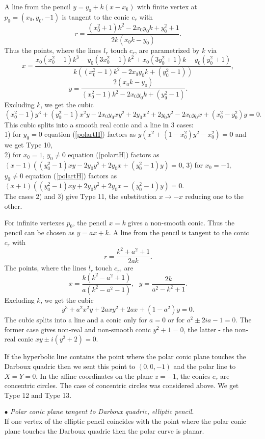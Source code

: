 \documentclass[11pt,a4paper]{article}
\begin{document}
A line from the pencil  $y=y_0+k(x - x_0)$ with  finite vertex at $p_0=(x_0,y_0,-1)$ is tangent to the conic $c_r$ with
$$
r=\frac{(x_0^2 + 1)k^2 - 2x_0y_0k + y_0^2 + 1}{2k(x_0k - y_0)}. 
$$ Thus the points, where the lines $l_r$ touch $c_r$, are parametrized by $k$ via 
$$
x=\frac{x_0(x_0^2 - 1)k^3 - y_0(3x_0^2 - 1)k^2 + x_0(3y_0^2 + 1)k - y_0(y_0^2 + 1)}{k((x_0^2 - 1)k^2 - 2x_0y_0k + (y_0^2 - 1))},
$$
$$
y=\frac{2(x_0k - y_0)}{(x_0^2 - 1)k^2 - 2x_0y_0k + (y_0^2 - 1)}. 
$$ 
Excluding $k$, we get the cubic
\begin{equation}\label{polartH}
(x_0^2 - 1)y^3 +(y_0^2 - 1)x^2y  - 2x_0y_0xy^2+ 2y_0x^2+ 2y_0y^2- 2x_0y_0x +(x_0^2 - y_0^2)y=0.
\end{equation}
This cubic splits into a smooth real conic and a line in 3 cases:\\ 
1) for $y_0=0$ equation (\ref{polartH}) factors as $y(x^2 +(1-x_0^2)y^2 - x_0^2)=0$ and we get Type 10,\\
 2)  for $x_0= 1$, $y_0\ne 0$ equation (\ref{polartH}) factors as $(x - 1)((y_0^2-1)xy - 2y_0y^2 +2y_0x+ (y_0^2-1)y)=0$,
3)  for $x_0= -1$, $y_0\ne 0$ equation (\ref{polartH}) factors as $(x + 1)((y_0^2-1)xy + 2y_0y^2 +2y_0x- (y_0^2-1)y)=0$.\\
The cases 2) and 3) give Type 11, the substitution $x\to -x$ reducing one to the other.   

For infinite vertexes $p_0$, the pencil $x=k$ gives a non-smooth conic. Thus the pencil can be chosen as $y=ax+k$. A line from the pencil is tangent to the conic $c_r$ with
$$
r=\frac{k^2+a^2+1}{2ak}. 
$$ The points, where the lines $l_r$ touch $c_r$, are  
$$
x=\frac{k(k^2 -a^2+1)}{a(k^2-a^2-1)}, \ \ \ y=\frac{2k}{a^2 - k^2 + 1}. 
$$ 
Excluding $k$, we get the cubic
$$
y^3+a^2x^2y+2axy^2+2ax+(1-a^2)y=0. 
$$
The cubic splits into a line and a conic only for $a=0$ or for $a^2 \pm 2ia -1=0$. The former case gives non-real and non-smooth conic $y^2+1=0$, the latter - the non-real conic  $xy \pm i  (y^2+2)=0$. 
 
 If the hyperbolic line contains the point where the polar conic plane touches the Darboux quadric then we sent this point to $(0,0,-1)$ and the polar line to $X=Y=0$.  In the affine coordinates on the plane $z=-1$, the conics $c_r$ are concentric circles. The case of concentric circles was considered above. We get Type 12 and Type 13. 


\smallskip

$\bullet${ \it Polar conic plane tangent to Darboux quadric, elliptic pencil}.\\  
\smallskip
If one vertex of the elliptic pencil coincides with the point  where the polar conic plane touches the Darboux quadric then the polar curve is planar.
\end{document}
